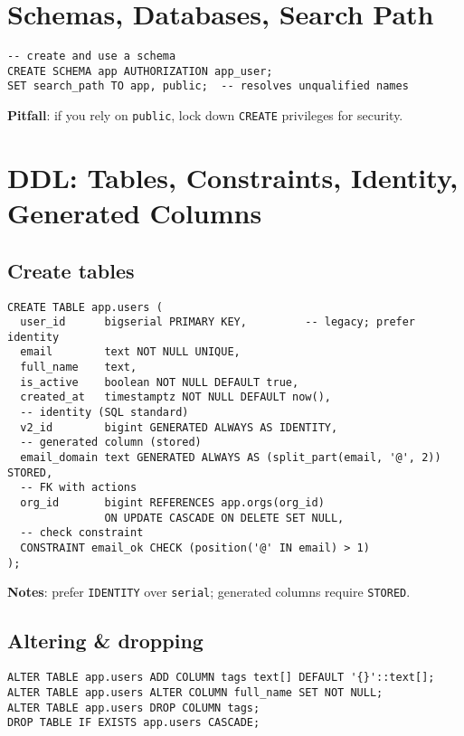 \documentclass[10pt]{article}
\begin{document}
\section{Schemas, Databases, Search Path}
\begin{lstlisting}[style=psql]
-- create and use a schema
CREATE SCHEMA app AUTHORIZATION app_user;
SET search_path TO app, public;  -- resolves unqualified names
\end{lstlisting}
\textbf{Pitfall}: if you rely on \texttt{public}, lock down \texttt{CREATE} privileges for security.

\section{DDL: Tables, Constraints, Identity, Generated Columns}
\subsection{Create tables}
\begin{lstlisting}[style=psql]
CREATE TABLE app.users (
  user_id      bigserial PRIMARY KEY,         -- legacy; prefer identity
  email        text NOT NULL UNIQUE,
  full_name    text,
  is_active    boolean NOT NULL DEFAULT true,
  created_at   timestamptz NOT NULL DEFAULT now(),
  -- identity (SQL standard)
  v2_id        bigint GENERATED ALWAYS AS IDENTITY,
  -- generated column (stored)
  email_domain text GENERATED ALWAYS AS (split_part(email, '@', 2)) STORED,
  -- FK with actions
  org_id       bigint REFERENCES app.orgs(org_id)
               ON UPDATE CASCADE ON DELETE SET NULL,
  -- check constraint
  CONSTRAINT email_ok CHECK (position('@' IN email) > 1)
);
\end{lstlisting}
\textbf{Notes}: prefer \texttt{IDENTITY} over \texttt{serial}; generated columns require \texttt{STORED}.

\subsection{Altering \& dropping}
\begin{lstlisting}[style=psql]
ALTER TABLE app.users ADD COLUMN tags text[] DEFAULT '{}'::text[];
ALTER TABLE app.users ALTER COLUMN full_name SET NOT NULL;
ALTER TABLE app.users DROP COLUMN tags;
DROP TABLE IF EXISTS app.users CASCADE;
\end{lstlisting}
\end{document}
